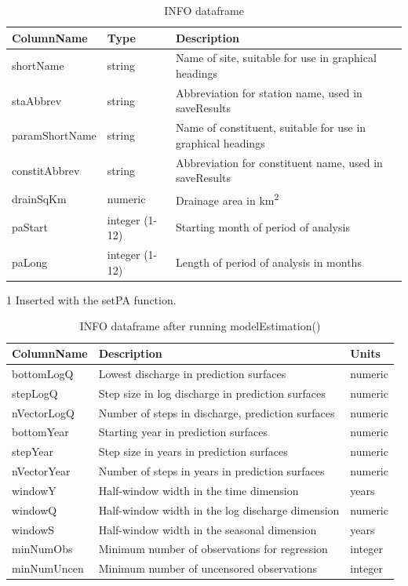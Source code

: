 \documentclass[a4paper,11pt]{article}\usepackage[]{graphicx}\usepackage[]{color}
\begin{document}
\begin{table}[!ht]
\centering
\begin{threeparttable}[b]
\caption{INFO dataframe}
\label{table:Info1}
\begin{tabular}{lll}
  \hline
ColumnName & Type & Description \\ 
  \hline
  shortName & string & Name of site, suitable for use in graphical headings \\ 
  staAbbrev & string & Abbreviation for station name, used in saveResults \\ 
  paramShortName & string & Name of constituent, suitable for use in graphical headings \\ 
  constitAbbrev & string & Abbreviation for constituent name, used in saveResults \\ 
  drainSqKm & numeric & Drainage area in  km\textsuperscript{2} \\ 
  paStart \tnote{1} & integer (1-12) & Starting month of period of analysis \\ 
  paLong \tnote{1} & integer (1-12) & Length of period of analysis in months \\ 
   \hline
\end{tabular}

\begin{tablenotes}
    \item[1] Inserted with the setPA function.
  \end{tablenotes}
 \end{threeparttable}
\end{table}


\begin{table}[!ht]
\centering
\caption{INFO dataframe after running modelEstimation()} 
\label{table:Info2}
\begin{tabular}{lll}
  \hline
ColumnName & Description & Units \\ 
  \hline
bottomLogQ & Lowest discharge in prediction surfaces & numeric \\ 
  stepLogQ & Step size in log discharge in prediction surfaces & numeric \\ 
  nVectorLogQ & Number of steps in discharge, prediction surfaces & numeric \\ 
  bottomYear & Starting year in prediction surfaces & numeric \\ 
  stepYear & Step size in years in prediction surfaces & numeric \\ 
  nVectorYear & Number of steps in years in prediction surfaces & numeric \\ 
  windowY & Half-window width in the time dimension & years \\ 
  windowQ & Half-window width in the log discharge dimension & numeric \\ 
  windowS & Half-window width in the seasonal dimension & years \\ 
  minNumObs & Minimum number of observations for regression & integer \\ 
  minNumUncen & Minimum number of uncensored observations & integer \\ 
   \hline
\end{tabular}
\end{table}
\end{document}
